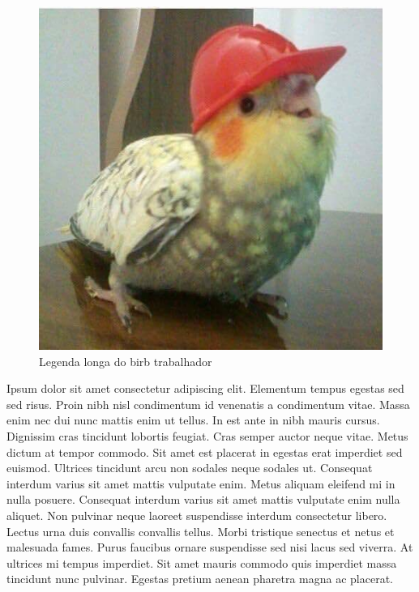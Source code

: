 \documentclass[12pt]{article}
\begin{document}
		\begin{figure}[H] %
			\centering
			\includegraphics[width=0.7\linewidth]{figuras/birb_01}
			\caption[Legenda curta do birb trabalhador]{Legenda longa do birb trabalhador}
			\label{fig:birb01}
		\end{figure}

		Ipsum dolor sit amet consectetur adipiscing elit. Elementum tempus egestas sed sed risus. Proin nibh nisl condimentum id venenatis a condimentum vitae. Massa enim nec dui nunc mattis enim ut tellus. In est ante in nibh mauris cursus. Dignissim cras tincidunt lobortis feugiat. Cras semper auctor neque vitae. Metus dictum at tempor commodo. Sit amet est placerat in egestas erat imperdiet sed euismod. Ultrices tincidunt arcu non sodales neque sodales ut. Consequat interdum varius sit amet mattis vulputate enim. Metus aliquam eleifend mi in nulla posuere. Consequat interdum varius sit amet mattis vulputate enim nulla aliquet. Non pulvinar neque laoreet suspendisse interdum consectetur libero. Lectus urna duis convallis convallis tellus. Morbi tristique senectus et netus et malesuada fames. Purus faucibus ornare suspendisse sed nisi lacus sed viverra. At ultrices mi tempus imperdiet. Sit amet mauris commodo quis imperdiet massa tincidunt nunc pulvinar. Egestas pretium aenean pharetra magna ac placerat.
		
\end{document}
